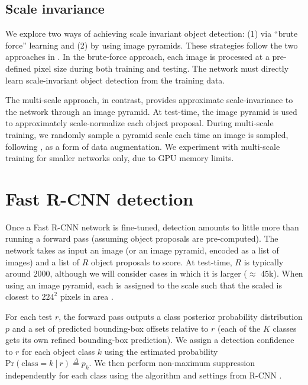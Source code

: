 \subsection{Scale invariance}
We explore two ways of achieving scale invariant object detection: (1) via ``brute force'' learning and (2) by using image pyramids.
These strategies follow the two approaches in \cite{he2014spp}.
In the brute-force approach, each image is processed at a pre-defined pixel size during both training and testing.
The network must directly learn scale-invariant object detection from the training data.

The multi-scale approach, in contrast, provides approximate scale-invariance to the network through an image pyramid.
At test-time, the image pyramid is used to approximately scale-normalize each object proposal.
During multi-scale training, we randomly sample a pyramid scale each time an image is sampled, following \cite{he2014spp}, as a form of data augmentation.
We experiment with multi-scale training for smaller networks only, due to GPU memory limits.

\section{Fast R-CNN detection}
Once a Fast R-CNN network is fine-tuned, detection amounts to little more than running a forward pass (assuming object proposals are pre-computed).
The network takes as input an image (or an image pyramid, encoded as a list of images) and a list of $R$ object proposals to score.
At test-time, $R$ is typically around $2000$, although we will consider cases in which it is larger ($\approx$ $45$k).
When using an image pyramid, each \roi is assigned to the scale such that the scaled \roi is closest to $224^2$ pixels in area \cite{he2014spp}.

For each test \roi $r$, the forward pass outputs a class posterior probability distribution $p$ and a set of predicted bounding-box offsets relative to $r$ (each of the $K$ classes gets its own refined bounding-box prediction).
We assign a detection confidence to $r$ for each object class $k$ using the estimated probability $\textrm{Pr}(\textrm{class} = k~|~r) \stackrel{\Delta}{=} p_k$.
We then perform non-maximum suppression independently for each class using the algorithm and settings from R-CNN \cite{girshick2014rcnn}.

